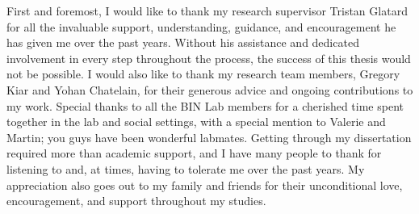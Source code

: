 \begin{acknowledgments}

  First and foremost, I would like to thank my research supervisor Tristan Glatard for all the invaluable support, understanding,
  guidance, and encouragement he has given me over the past years.
  Without his assistance and dedicated involvement in every step throughout the process, the success of this thesis would not be possible.
  I would also like to thank my research team members, Gregory Kiar and Yohan Chatelain, for their generous advice and ongoing contributions to my work.
  Special thanks to all the BIN Lab members for a cherished time spent together in the lab and social settings,
  with a special mention to Valerie and Martin; you guys have been wonderful labmates.
  Getting through my dissertation required more than academic support, and I have many people to thank for listening to and, at times, 
  having to tolerate me over the past years. 
  My appreciation also goes out to my family and friends for their unconditional love, encouragement, and support throughout my studies.

\end{acknowledgments}